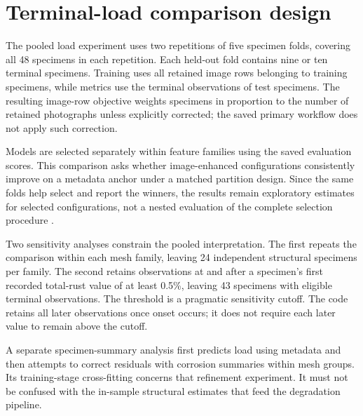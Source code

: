 \section{Terminal-load comparison design}\label{sec:capacitydesign}
The pooled load experiment uses two repetitions of five specimen folds, covering all 48 specimens in each repetition. Each held-out fold contains nine or ten terminal specimens. Training uses all retained image rows belonging to training specimens, while metrics use the terminal observations of test specimens. The resulting image-row objective weights specimens in proportion to the number of retained photographs unless explicitly corrected; the saved primary workflow does not apply such correction.

Models are selected separately within feature families using the saved evaluation scores. This comparison asks whether image-enhanced configurations consistently improve on a metadata anchor under a matched partition design. Since the same folds help select and report the winners, the results remain exploratory estimates for selected configurations, not a nested evaluation of the complete selection procedure \citep{cawley2010}.

Two sensitivity analyses constrain the pooled interpretation. The first repeats the comparison within each mesh family, leaving 24 independent structural specimens per family. The second retains observations at and after a specimen's first recorded total-rust value of at least 0.5\%, leaving 43 specimens with eligible terminal observations. The threshold is a pragmatic sensitivity cutoff. The code retains all later observations once onset occurs; it does not require each later value to remain above the cutoff.

A separate specimen-summary analysis first predicts load using metadata and then attempts to correct residuals with corrosion summaries within mesh groups. Its training-stage cross-fitting concerns that refinement experiment. It must not be confused with the in-sample structural estimates that feed the degradation pipeline.

